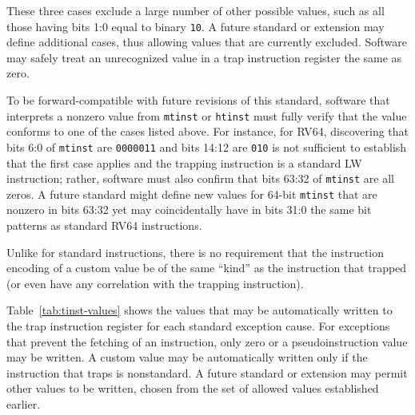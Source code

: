 These three cases exclude a large number of other possible values, such
as all those having bits 1:0 equal to binary {\tt 10}.
A future standard or extension may define additional cases, thus allowing
values that are currently excluded.
Software may safely treat an unrecognized value in a trap instruction
register the same as zero.

\begin{commentary}
To be forward-compatible with future revisions of this standard, software
that interprets a nonzero value from {\tt mtinst} or {\tt htinst} must
fully verify that the value conforms to one of the cases listed above.
For instance, for RV64, discovering that bits 6:0 of {\tt mtinst} are
{\tt 0000011} and bits 14:12 are {\tt 010} is not sufficient to establish
that the first case applies and the trapping instruction is a standard LW
instruction;
rather, software must also confirm that bits 63:32 of {\tt mtinst} are
all zeros.
A future standard might define new values for 64-bit {\tt mtinst} that
are nonzero in bits 63:32 yet may coincidentally have in bits 31:0 the
same bit patterns as standard RV64 instructions.
\end{commentary}

\begin{commentary}
Unlike for standard instructions, there is no requirement that the
instruction encoding of a custom value be of the same ``kind'' as the
instruction that trapped (or even have any correlation with the trapping
instruction).
\end{commentary}

Table~\ref{tab:tinst-values} shows the values that may be automatically
written to the trap instruction register for each standard exception
cause.
For exceptions that prevent the fetching of an instruction, only zero or
a pseudoinstruction value may be written.
A custom value may be automatically written only if the instruction that
traps is nonstandard.
A future standard or extension may permit other values to be written,
chosen from the set of allowed values established earlier.

